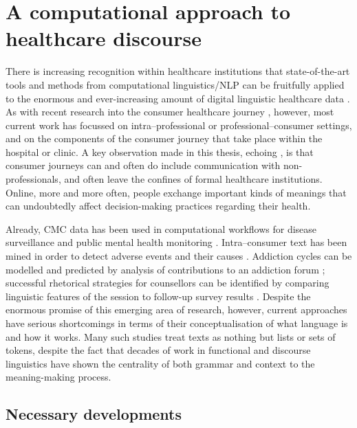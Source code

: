 \section{A computational approach to healthcare discourse}

There is increasing recognition within healthcare institutions that state\hyp{}of\hyp{}the\hyp{}art tools and methods from computational linguistics\slash \gls{NLP} can be fruitfully applied to the enormous and ever\hyp{}increasing amount of digital linguistic healthcare data \cite{velupillai2015recent}. As with recent research into the consumer healthcare journey \cite{slade_communicating_2015}, however, most current work has focussed on intra--professional or professional--\gls{consumer} settings, and on the components of the \gls{consumer} journey that take place within the hospital or clinic. A key observation made in this thesis, echoing \textcite{jones_health_2013}, is that consumer journeys can and often do include communication with non\hyp{}professionals, and often leave the confines of formal healthcare institutions. Online, more and more often, people exchange important kinds of meanings that can undoubtedly affect decision\hyp{}making practices regarding their health.

Already, \gls{CMC} data has been used in computational workflows for disease surveillance \cite{kim_use_2013} and public mental health monitoring \cite{paul_social_2016}. Intra--consumer text has been mined in order to detect adverse events and their causes \cite{chee2011predicting}. Addiction cycles can be modelled and predicted by analysis of contributions to an addiction \gls{forum} \cite{maclean_forum77:_2015}; successful rhetorical strategies for counsellors can be identified by comparing linguistic features of the session to follow\hyp{}up survey results \cite{althoff_counseling_2016}. Despite the enormous promise of this emerging area of research, however, current approaches have serious shortcomings in terms of their conceptualisation of what language is and how it works. Many such studies treat texts as nothing but lists or sets of tokens, despite the fact that decades of work in functional and discourse linguistics have shown the centrality of both grammar and context to the meaning\hyp{}making process.

\subsection{Necessary developments}


